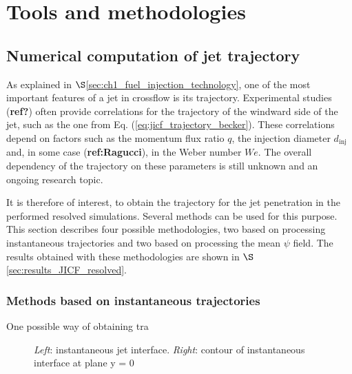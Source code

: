 \section{Tools and methodologies}

\subsection{Numerical computation of jet trajectory}
	\label{sec:ch5_jicf_trajectories}

As explained in $\S$\ref{sec:ch1_fuel_injection_technology}, one of the most important features of a jet in crossflow is its trajectory. Experimental studies (\textbf{ref?}) often provide correlations for the trajectory of the windward side of the jet, such as the one from Eq. (\ref{eq:jicf_trajectory_becker}). These correlations depend on factors such as the momentum flux ratio $q$, the injection diameter $d_\mathrm{inj}$ and, in some case (\textbf{ref:Ragucci}), in the Weber number $We$. The overall dependency of the trajectory on these parameters is still unknown and an ongoing research topic.

It is therefore of interest, to obtain the trajectory for the jet penetration in the performed resolved simulations. Several methods can be used for this purpose. This section describes four possible methodologies, two based on processing instantaneous trajectories and two based on processing the mean $\psi$ field. The results obtained with these methodologies are shown in $\S$\ref{sec:results_JICF_resolved}.

\subsubsection{Methods based on instantaneous trajectories}

One possible way of obtaining tra

\begin{figure}[ht]
     \centering
     \begin{subfigure}[b]{0.45\textwidth}
         \centering
     \end{subfigure}
     \begin{subfigure}[b]{0.45\textwidth}
         \centering
     \end{subfigure}
        \caption{\textsl{Left}: instantaneous jet interface. \textsl{Right}: contour of instantaneous interface at plane y = 0}
        \label{fig:trajectory_obtention_instantaneous_general}
\end{figure}



